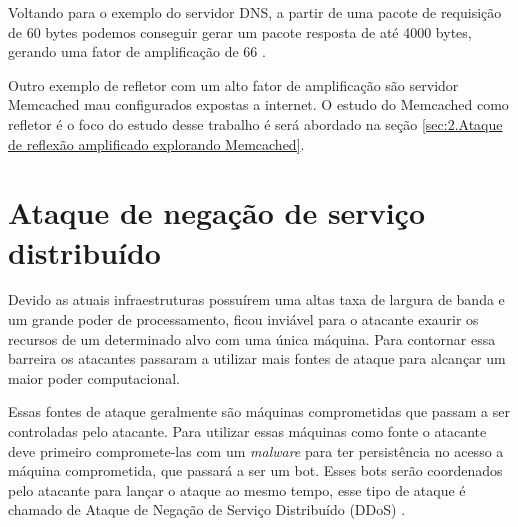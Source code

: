 Voltando para o exemplo do servidor DNS, a partir de uma pacote de requisição de 60 bytes podemos conseguir gerar um pacote resposta de até 4000 bytes, gerando uma fator de amplificação de 66 \cite{Anagnostopoulos2013}.

Outro exemplo de refletor com um alto fator de amplificação são servidor Memcached mau configurados expostas a internet. O estudo do Memcached como refletor é o foco do estudo desse trabalho é será abordado na seção \ref{sec:2.Ataque de reflexão amplificado explorando Memcached}.

\section{Ataque de negação de serviço distribuído} \label{sec:2.Ataque de negação de serviço distribuído}

Devido as atuais infraestruturas possuírem uma altas taxa de largura de banda e um grande poder de processamento, ficou inviável para o atacante exaurir os recursos de um determinado alvo com uma única máquina. Para contornar essa barreira os atacantes passaram a utilizar mais fontes de ataque para alcançar um maior poder computacional. 

Essas fontes de ataque geralmente são máquinas comprometidas que passam a ser controladas pelo atacante. Para utilizar essas máquinas como fonte o atacante deve primeiro compromete-las com um \textit{malware} para ter persistência no acesso a máquina comprometida, que passará a ser um bot. Esses bots serão coordenados pelo atacante para lançar o ataque ao mesmo tempo, esse tipo de ataque é chamado de Ataque de Negação de Serviço Distribuído (\acrfull{DDoS}) \cite{Gu2012}. 


